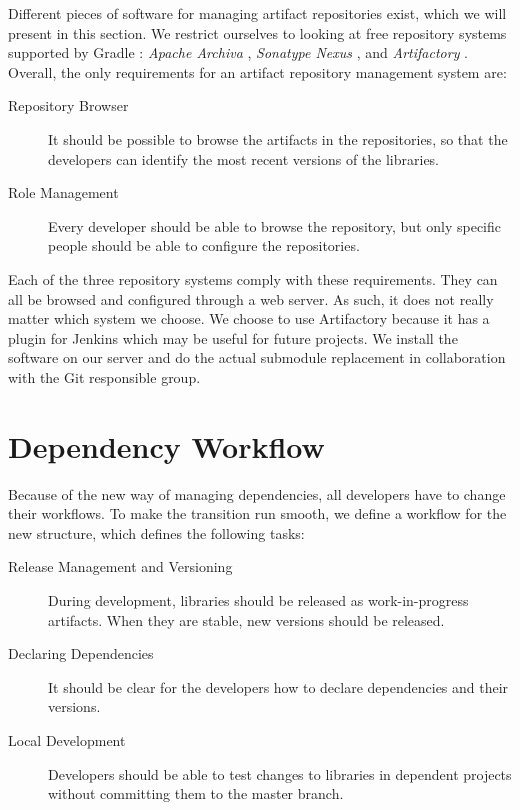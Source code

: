 Different pieces of software for managing artifact repositories exist, which we will present in this section. We restrict ourselves to looking at free repository systems supported by Gradle \parencite{gradle-dependencies-doc}: \emph{Apache Archiva} \parencite{archiva-website}, \emph{Sonatype Nexus} \parencite{nexus-website}, and \emph{Artifactory} \parencite{artifactory-website}. Overall, the only requirements for an artifact repository management system are:
\begin{description}
  \item[Repository Browser] It should be possible to browse the artifacts in the repositories, so that the developers can identify the most recent versions of the libraries.
  \item[Role Management] Every developer should be able to browse the repository, but only specific people should be able to configure the repositories.
\end{description}
Each of the three repository systems comply with these requirements. They can all be browsed and configured through a web server. As such, it does not really matter which system we choose. We choose to use Artifactory because it has a plugin for Jenkins which may be useful for future projects. We install the software on our server and do the actual submodule replacement in collaboration with the Git responsible group.

\section{Dependency Workflow}\label{sec:dependency_workflow}
Because of the new way of managing dependencies, all developers have to change their workflows. To make the transition run smooth, we define a workflow for the new structure, which defines the following tasks:
\begin{description}
  \item[Release Management and Versioning] During development, libraries should be released as work-in-progress artifacts. When they are stable, new versions should be released.
  \item[Declaring Dependencies] It should be clear for the developers how to declare dependencies and their versions.
  \item[Local Development] Developers should be able to test changes to libraries in dependent projects without committing them to the master branch.
\end{description}

